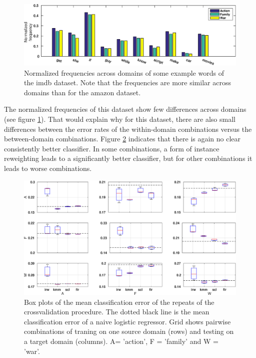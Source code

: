\documentclass[twoside,11pt]{article}
\begin{document}
\begin{figure}[ht]
\centering
\includegraphics[width=\textwidth]{images/eg_imdb.eps}
\caption{Normalized frequencies across domains of some example words of the imdb dataset. Note that the frequencies are more similar across domains than for the amazon dataset.}
\label{eg_imdb}
\end{figure}

The normalized frequencies of this dataset show few differences across domains (see figure \ref{eg_imdb}). That would explain why for this dataset, there are also small differences between the error rates of the within-domain combinations versus the between-domain combinations. Figure \ref{err_imdb} indicates that there is again no clear consistently better classifier. In some combinations, a form of instance reweighting leads to a significantly better classifier, but for other combinations it leads to worse combinations.
																
\begin{figure}[ht]
	\centering
	\includegraphics[width=\textwidth]{images/err_imdb_box.eps}
	\caption{Box plots of the mean classification error of the repeats of the crossvalidation procedure. The dotted black line is the mean classification error of a naive logistic regressor. Grid shows pairwise combinations of traning on one source domain (rows) and testing on a target domain (columns). A= 'action', F = 'family' and W = 'war'.}
	\label{err_imdb}
\end{figure}
\end{document}
